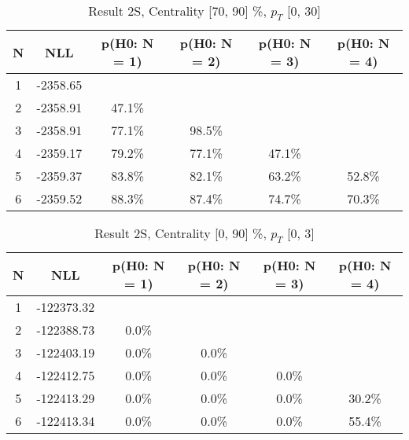\begin{table}[htb]
	\begin{center}
	\caption{Result 2S, Centrality [70, 90] \%, $p_{T}$ [0, 30] \GeV
}
{\footnotesize\renewcommand{\arraystretch}{1.4}
		\begin{tabular}{cc||>{\columncolor[gray]{0.8}}cccc}
			N & NLL & p(H0: N = 1) & p(H0: N = 2) & p(H0: N = 3) & p(H0: N = 4)\\ 
		\hline
1 & -2358.65 & & & & \\
2 & -2358.91 & 47.1\% & & & \\
3 & -2358.91 & 77.1\% & 98.5\% & & \\
4 & -2359.17 & 79.2\% & 77.1\% & 47.1\% & \\
5 & -2359.37 & 83.8\% & 82.1\% & 63.2\% & 52.8\% \\
6 & -2359.52 & 88.3\% & 87.4\% & 74.7\% & 70.3\% \\
	\end{tabular}
		\label{tab:lab}
	}
	\end{center}\end{table}

\begin{table}[htb]
	\begin{center}
	\caption{Result 2S, Centrality [0, 90] \%, $p_{T}$ [0, 3] \GeV
}
{\footnotesize\renewcommand{\arraystretch}{1.4}
		\begin{tabular}{cc||ccc>{\columncolor[gray]{0.8}}c}
			N & NLL & p(H0: N = 1) & p(H0: N = 2) & p(H0: N = 3) & p(H0: N = 4)\\ 
		\hline
1 & -122373.32 & & & & \\
2 & -122388.73 & 0.0\% & & & \\
3 & -122403.19 & 0.0\% & 0.0\% & & \\
4 & -122412.75 & 0.0\% & 0.0\% & 0.0\% & \\
5 & -122413.29 & 0.0\% & 0.0\% & 0.0\% & 30.2\% \\
6 & -122413.34 & 0.0\% & 0.0\% & 0.0\% & 55.4\% \\
	\end{tabular}
		\label{tab:lab}
	}
	\end{center}\end{table}

